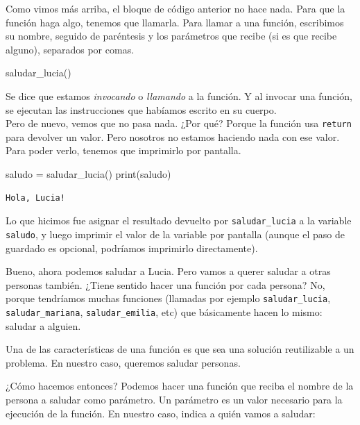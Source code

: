 \documentclass[
  letterpaper,
  DIV=11,
  numbers=noendperiod]{scrreprt}
\newenvironment{Shaded}{\begin{snugshade}}{\end{snugshade}}
\newcommand{\BuiltInTok}[1]{\textcolor[rgb]{0.00,0.23,0.31}{#1}}
\newcommand{\NormalTok}[1]{\textcolor[rgb]{0.00,0.23,0.31}{#1}}
\newcommand{\OperatorTok}[1]{\textcolor[rgb]{0.37,0.37,0.37}{#1}}
\begin{document}
Como vimos más arriba, el bloque de código anterior no hace nada. Para
que la función haga algo, tenemos que llamarla. Para llamar a una
función, escribimos su nombre, seguido de paréntesis y los parámetros
que recibe (si es que recibe alguno), separados por comas.

\begin{Shaded}
\begin{Highlighting}[]
\NormalTok{saludar\_lucia()}
\end{Highlighting}
\end{Shaded}

Se dice que estamos \emph{invocando} o \emph{llamando} a la función. Y
al invocar una función, se ejecutan las instrucciones que habíamos
escrito en su cuerpo.\\

Pero de nuevo, vemos que no pasa nada. ¿Por qué? Porque la función usa
\texttt{return} para devolver un valor. Pero nosotros no estamos
haciendo nada con ese valor. Para poder verlo, tenemos que imprimirlo
por pantalla.

\begin{Shaded}
\begin{Highlighting}[]
\NormalTok{saludo }\OperatorTok{=}\NormalTok{ saludar\_lucia()}
\BuiltInTok{print}\NormalTok{(saludo)}
\end{Highlighting}
\end{Shaded}

\begin{verbatim}
Hola, Lucia!
\end{verbatim}

Lo que hicimos fue asignar el resultado devuelto por
\texttt{saludar\_lucia} a la variable \texttt{saludo}, y luego imprimir
el valor de la variable por pantalla (aunque el paso de guardado es
opcional, podríamos imprimirlo directamente).

Bueno, ahora podemos saludar a Lucia. Pero vamos a querer saludar a
otras personas también. ¿Tiene sentido hacer una función por cada
persona? No, porque tendríamos muchas funciones (llamadas por ejemplo
\texttt{saludar\_lucia}, \texttt{saludar\_mariana},
\texttt{saludar\_emilia}, etc) que básicamente hacen lo mismo: saludar a
alguien.

Una de las características de una función es que sea una solución
reutilizable a un problema. En nuestro caso, queremos saludar personas.

¿Cómo hacemos entonces? Podemos hacer una función que reciba el nombre
de la persona a saludar como parámetro. Un parámetro es un valor
necesario para la ejecución de la función. En nuestro caso, indica a
quién vamos a saludar:
\end{document}
